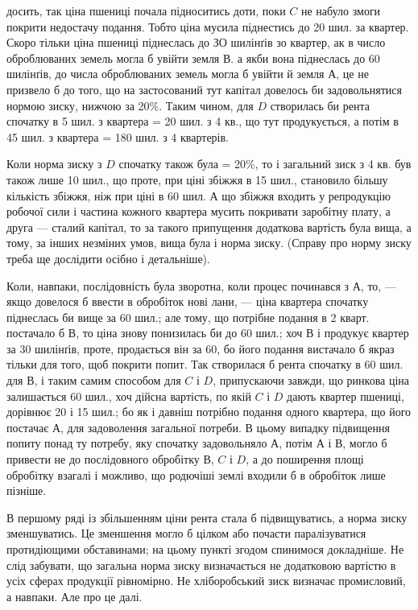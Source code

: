\parcont{}  %
досить, так ціна пшениці почала підноситись доти, поки $C$ не набуло змоги
покрити недостачу подання. Тобто ціна мусила піднестись до 20 шил. за
квартер. Скоро тільки ціна пшениці піднеслась до ЗО шилінґів зо квартер, ак
в число оброблюваних земель могла б увійти земля В. а якби вона піднеслась
до 60 шилінґів, до числа оброблюваних земель могла б увійти й земля А, це
не призвело б до того, що на застосований тут капітал довелось би задовольнятися
нормою зиску, нижчою за 20\%. Таким чином, для $D$ створилась би
рента спочатку в 5 шил. з квартера = 20 шил. з 4 кв., що тут продукується,
а потім в 45 шил. з квартера = 180 шил. з 4 квартерів.

Коли норма зиску з $D$ спочатку також була = 20\%, то і загальний зиск
з 4 кв. був також лише 10 шил., що проте, при ціні збіжжя в 15 шил., становило
більшу кількість збіжжя, ніж при ціні в 60 шил. А що збіжжя входить
у репродукцію робочої сили і частина кожного квартера мусить покривати заробітну
плату, а друга — сталий капітал, то за такого припущення додаткова
вартість була вища, а тому, за інших незміних умов, вища була і норма зиску.
(Справу про норму зиску треба ще дослідити осібно і детальніше).

Коли, навпаки, послідовність була зворотна, коли процес починався з $А$,
то, — якщо довелося б ввести в обробіток нові лани, — ціна квартера спочатку
піднеслась би вище за 60 шил.; але тому, що потрібне подання в 2 кварт. постачало
б $В$, то ціна знову понизилась би до 60 шил.; хоч $В$ і продукує квартер
за 30 шилінґів, проте, продається він за 60, бо його подання вистачало б
якраз тільки для того, щоб покрити попит. Так створилася б рента спочатку в
60 шил. для $В$, і таким самим способом для $C$ і $D$, припускаючи завжди, що
ринкова ціна залишається 60 шил., хоч дійсна вартість, по якій $C$ і $D$ дають
квартер пшениці, дорівнює 20 і 15 шил.; бо як і давніш потрібно подання одного
квартера, що його постачає $А$, для задоволення загальної потреби. В цьому випадку
підвищення попиту понад ту потребу, яку спочатку задовольняло $А$, потім
$А$ і $В$, могло б привести не до послідовного обробітку $В$, $C$ і $D$, а до поширення
площі обробітку взагалі і можливо, що родючіші землі входили б в обробіток
лише пізніше.

В першому ряді із збільшенням ціни рента стала б підвищуватись, а норма
зиску зменшуватись. Це зменшення могло б цілком або почасти паралізуватися
протидіющими обставинами; на цьому пункті згодом спинимося докладніше.
Не слід забувати, що загальна норма зиску визначається не додатковою вартістю
в усіх сферах продукції рівномірно. Не хліборобський зиск визначає промисловий,
а навпаки. Але про це далі.

